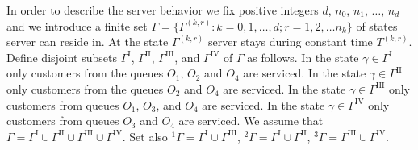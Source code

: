 \documentclass[60x84/16,10pt]{dccn}
\begin{document}
{In order to describe the server behavior we fix positive integers $d$, $n_0$, $n_1$, $\ldots$,
$n_d$ and we introduce a finite set $\Gamma=\{\Gamma^{(k,r)} \colon k=0,1,\ldots,d; r=1,2,\ldots
n_k\}$ of states server can reside in. At the state $\Gamma^{(k,r)}$ server stays during constant
time $T^{(k,r)}$. Define disjoint subsets $\Gamma^{\mathrm{I}}$, $\Gamma^{\mathrm{II}}$,
$\Gamma^{\mathrm{III}}$, and $\Gamma^{\mathrm{IV}}$ of $\Gamma$ as follows.  In the state $\gamma
\in \Gamma^{\mathrm{I}}$ only customers from the queues $O_1$, $O_2$ and $O_4$ are serviced.  In the
state $\gamma \in \Gamma^{\mathrm{II}}$ only customers from the queues $O_2$ and $O_4$ are serviced.
In the state $\gamma \in \Gamma^{\mathrm{III}}$ only customers from queues $O_1$, $O_3$, and $O_4$
are serviced.  In the state $\gamma \in \Gamma^{\mathrm{IV}}$ only customers from queues $O_3$ and
$O_4$ are serviced.  We assume that $\Gamma = \Gamma^{\mathrm{I}} \cup \Gamma^{\mathrm{II}} \cup
\Gamma^{\mathrm{III}} \cup \Gamma^{\mathrm{IV}}$. Set also ${}^1\Gamma=\Gamma^{\mathrm{I}} \cup
\Gamma^{\mathrm{III}}$, ${}^2\Gamma=\Gamma^{\mathrm{I}} \cup \Gamma^{\mathrm{II}}$,
${}^3\Gamma=\Gamma^{\mathrm{III}} \cup \Gamma^{\mathrm{IV}}$.

}
\end{document}
